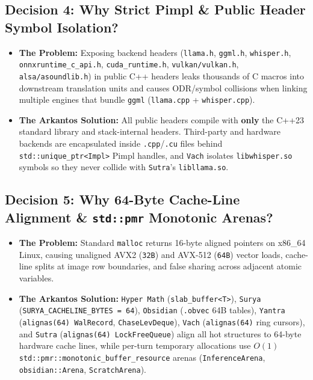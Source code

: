\documentclass[11pt,a4paper]{article}
\begin{document}
\subsection{Decision 4: Why Strict Pimpl \& Public Header Symbol Isolation?}
\begin{itemize}[leftmargin=1.5em]
  \item \textbf{The Problem:} Exposing backend headers (\texttt{llama.h}, \texttt{ggml.h}, \texttt{whisper.h}, \texttt{onnxruntime\_c\_api.h}, \texttt{cuda\_runtime.h}, \texttt{vulkan/vulkan.h}, \texttt{alsa/asoundlib.h}) in public C++ headers leaks thousands of C macros into downstream translation units and causes ODR/symbol collisions when linking multiple engines that bundle \texttt{ggml} (\texttt{llama.cpp} + \texttt{whisper.cpp}).
  \item \textbf{The Arkantos Solution:} All public headers compile with \textbf{only} the C++23 standard library and stack-internal headers. Third-party and hardware backends are encapsulated inside \texttt{.cpp}/\texttt{.cu} files behind \texttt{std::unique\_ptr<Impl>} Pimpl handles, and \texttt{Vach} isolates \texttt{libwhisper.so} symbols so they never collide with \texttt{Sutra}'s \texttt{libllama.so}.
\end{itemize}

\subsection{Decision 5: Why 64-Byte Cache-Line Alignment \& \texttt{std::pmr} Monotonic Arenas?}
\begin{itemize}[leftmargin=1.5em]
  \item \textbf{The Problem:} Standard \texttt{malloc} returns 16-byte aligned pointers on x86\_64 Linux, causing unaligned AVX2 (\texttt{32B}) and AVX-512 (\texttt{64B}) vector loads, cache-line splits at image row boundaries, and false sharing across adjacent atomic variables.
  \item \textbf{The Arkantos Solution:} \texttt{Hyper Math} (\texttt{slab\_buffer<T>}), \texttt{Surya} (\texttt{SURYA\_CACHELINE\_BYTES = 64}), \texttt{Obsidian} (\texttt{.obvec} 64B tables), \texttt{Yantra} (\texttt{alignas(64) WalRecord}, \texttt{ChaseLevDeque}), \texttt{Vach} (\texttt{alignas(64)} ring cursors), and \texttt{Sutra} (\texttt{alignas(64) LockFreeQueue}) align all hot structures to 64-byte hardware cache lines, while per-turn temporary allocations use $O(1)$ \texttt{std::pmr::monotonic\_buffer\_resource} arenas (\texttt{InferenceArena}, \texttt{obsidian::Arena}, \texttt{ScratchArena}).
\end{itemize}
\end{document}
